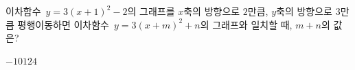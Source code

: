 이차함수~$y=3(x+1)^2-2$의 그래프를 $x$축의 방향으로 $2$만큼, $y$축의 방향으로 $3$만큼 평행이동하면 이차함수~$y=3(x+m)^2+n$의 그래프와 일치할 때, $m+n$의 값은?
\begin{choices32}{$-1$}{$0$}{$1$}{$2$}{$4$}\end{choices32}
